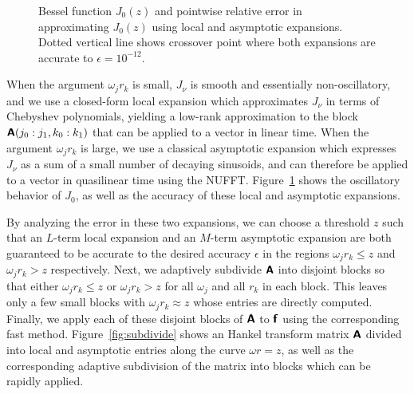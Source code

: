 \begin{figure}[!t]
\begin{subfigure}[b]{0.45\textwidth}
  \end{subfigure}
  \caption{Bessel function $J_0(z)$ and pointwise relative error in
  approximating $J_0(z)$ using local and asymptotic expansions. Dotted vertical
  line shows crossover point where both expansions are accurate to $\epsilon =
  10^{-12}$.}
  \label{fig:two-expansions}
\end{figure}

When the argument $\omega_j r_k$ is small, $J_\nu$ is smooth and essentially
non-oscillatory, and we use a closed-form local expansion which approximates
$J_\nu$ in terms of Chebyshev polynomials, yielding a low-rank approximation to
the block $\bm{\mathsf{A}}(j_0:j_1, k_0:k_1)$ that can be applied to a vector in linear
time. When the argument $\omega_j r_k$ is large, we use a classical asymptotic
expansion which expresses $J_\nu$ as a sum of a small number of decaying
sinusoids, and can therefore be applied to a vector in quasilinear time using
the NUFFT. Figure~\ref{fig:two-expansions} shows the oscillatory behavior of
$J_0$, as well as the accuracy of these local and asymptotic expansions.

By analyzing the error in these two expansions, we can choose a threshold $z$
such that an $L$-term local expansion and an $M$-term asymptotic expansion are
both guaranteed to be accurate to the desired accuracy $\epsilon$ in the regions
$\omega_j r_k \leq z$ and $\omega_j r_k > z$ respectively. Next, we adaptively
subdivide $\bm{\mathsf{A}}$ into disjoint blocks so that either $\omega_j r_k \leq z$ or
$\omega_j r_k > z$ for all $\omega_j$ and all $r_k$ in each block. This leaves
only a few small blocks with $\omega_j r_k \approx z$ whose entries are directly
computed. Finally, we apply each of these disjoint blocks of $\bm{\mathsf{A}}$ to
$\bm{\mathsf{f}}$ using the corresponding fast method. Figure~\ref{fig:subdivide} shows
an Hankel transform matrix $\bm{\mathsf{A}}$ divided into local and asymptotic entries
along the curve $\omega r = z$, as well as the corresponding adaptive
subdivision of the matrix into blocks which can be rapidly applied.

